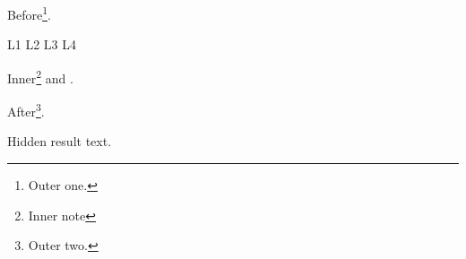 \documentclass{article}
\begin{document}
Before\footnote{Outer one.}.
\begin{LTXexample}[linerange={2-3},rangeaccept=true]
L1
L2
L3
L4
\end{LTXexample}
\begin{LTXexample}
Inner\footnote{Inner note} and \cite{k}.
\end{LTXexample}
After\footnote{Outer two.}.
\begin{LTXexample}[graphic=example-image]
Hidden result text.
\end{LTXexample}
\end{document}
